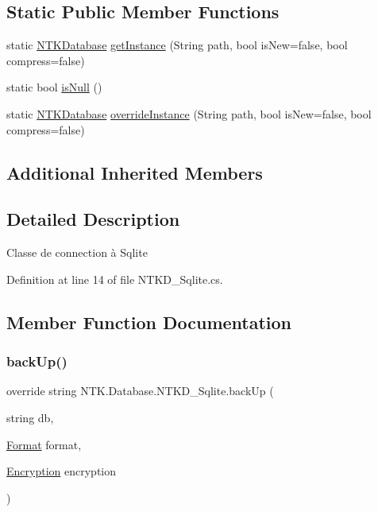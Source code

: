 \subsection*{Static Public Member Functions}
\begin{DoxyCompactItemize}
\item 
static \mbox{\hyperlink{class_n_t_k_1_1_database_1_1_n_t_k_database}{N\+T\+K\+Database}} \mbox{\hyperlink{class_n_t_k_1_1_database_1_1_n_t_k_d___sqlite_a7a268079a13e60f55f30bf2268af47f4}{get\+Instance}} (String path, bool is\+New=false, bool compress=false)
\item 
static bool \mbox{\hyperlink{class_n_t_k_1_1_database_1_1_n_t_k_d___sqlite_a8ba9f96975a7bb0597ff5c0e0d5d054e}{is\+Null}} ()
\item 
static \mbox{\hyperlink{class_n_t_k_1_1_database_1_1_n_t_k_database}{N\+T\+K\+Database}} \mbox{\hyperlink{class_n_t_k_1_1_database_1_1_n_t_k_d___sqlite_a529745b919c7bf51f1fff5c9e3788e3c}{override\+Instance}} (String path, bool is\+New=false, bool compress=false)
\end{DoxyCompactItemize}
\subsection*{Additional Inherited Members}


\subsection{Detailed Description}
Classe de connection à Sqlite 



Definition at line 14 of file N\+T\+K\+D\+\_\+\+Sqlite.\+cs.



\subsection{Member Function Documentation}
\mbox{\label{class_n_t_k_1_1_database_1_1_n_t_k_d___sqlite_a6331e5614526c861e24a1d92e7a257f8}} 
\subsubsection{\texorpdfstring{backUp()}{backUp()}\hspace{0.1cm}{\footnotesize\ttfamily [1/2]}}
{\footnotesize\ttfamily override string N\+T\+K.\+Database.\+N\+T\+K\+D\+\_\+\+Sqlite.\+back\+Up (\begin{DoxyParamCaption}\item[{string}]{db,  }\item[{\mbox{\hyperlink{namespace_n_t_k_1_1_database_a9bed700210ca4ed5854002637b664789}{Format}}}]{format,  }\item[{\mbox{\hyperlink{namespace_n_t_k_1_1_database_aa21afe93187a6c77c4ccdc988b3c4ac2}{Encryption}}}]{encryption }\end{DoxyParamCaption})}






